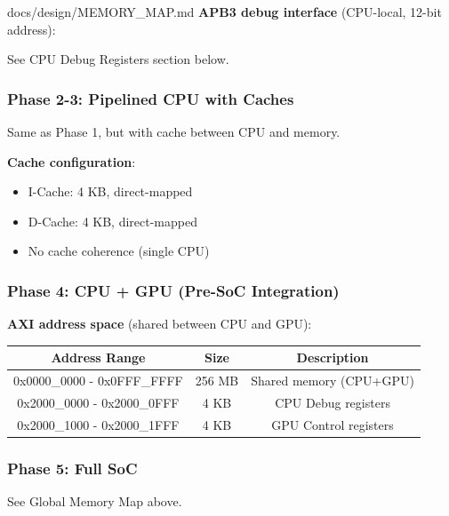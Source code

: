 \begin{relocated}{docs/design/MEMORY_MAP.md}
\textbf{APB3 debug interface} (CPU-local, 12-bit address):

See CPU Debug Registers section below.

\subsubsection{Phase 2-3: Pipelined CPU with Caches}\label{ds:mm:memory-map:phase-2-3-pipelined-cpu-with-caches}

Same as Phase 1, but with cache between CPU and memory.

\textbf{Cache configuration}:

\begin{itemize}
\tightlist
\item
  I-Cache: 4 KB, direct-mapped
\item
  D-Cache: 4 KB, direct-mapped
\item
  No cache coherence (single CPU)
\end{itemize}

\subsubsection{Phase 4: CPU + GPU (Pre-SoC Integration)}\label{ds:mm:memory-map:phase-4-cpu-gpu-pre-soc-integration}

\textbf{AXI address space} (shared between CPU and GPU):

{
\begin{longtable}[]{@{}ccc@{}}
\toprule\noalign{}
Address Range & Size & Description \\
\midrule\noalign{}
\endhead
\bottomrule\noalign{}
\endlastfoot
0x0000\_\allowbreak{}0000 - 0x0FFF\_\allowbreak{}FFFF & 256 MB & Shared
memory (CPU+GPU) \\
0x2000\_\allowbreak{}0000 - 0x2000\_\allowbreak{}0FFF & 4 KB & CPU Debug
registers \\
0x2000\_\allowbreak{}1000 - 0x2000\_\allowbreak{}1FFF & 4 KB & GPU
Control registers \\
\end{longtable}
}

\subsubsection{Phase 5: Full SoC}\label{ds:mm:memory-map:phase-5-full-soc}

See Global Memory Map above.
\end{relocated}

